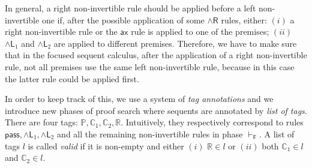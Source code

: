 \documentclass[submission,copyright,creativecommons]{eptcs}
\theoremstyle{definition}
\newcommand{\pass}{\mathsf{pass}}
\newcommand{\andlone}{\land \mathsf{L}_{1}}
\newcommand{\andltwo}{\land \mathsf{L}_{2}}
\newcommand{\andr}{\land \mathsf{R}}
\newcommand{\ax}{\mathsf{ax}}
\newcommand{\Pass}{\mathsf{P}}
\newcommand{\F}{\mathsf{F}}
\newcommand{\tP}{\mathbb{P}}
\newcommand{\tCone}{\mathbb{C}_1}
\newcommand{\tCtwo}{\mathbb{C}_2}
\newcommand{\tE}{\mathbb{R}}
\begin{document}
In general, a right non-invertible rule should be applied  before a left non-invertible one if, after the possible application of some $\andr$ rules, either:
$(i)$ a right non-invertible rule or the $\ax$ rule is applied to one of the premises;
$(ii)$ $\andlone$ and $\andltwo$ are applied to different premises.
Therefore, we have to make sure that in the focused sequent calculus, after the application of a right non-invertible rule, not all premises use the same left non-invertible rule, because in this case the latter rule could be applied first.

In order to keep track of this,
we use a system of \emph{tag annotations} and we introduce new phases of proof search where sequents are annotated by \emph{list of tags}. 
There are four tags: $\tP , \tCone , \tCtwo , \tE$. Intuitively, they respectively correspond to rules $\pass , \andlone , \andltwo$ and all the remaining non-invertible rules in phase $\vdash_\F$.
A list of tags $l$ is called \emph{valid} if it is non-empty and either $(i)$ $\tE \in l$ or $(ii)$ both $\tCone \in l$ and $\tCtwo \in l$.
\end{document}

